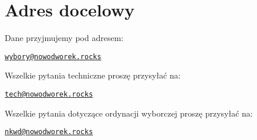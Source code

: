 \appendix

\section{Adres docelowy}

Dane przyjmujemy pod adresem:
\begin{center}\href{mailto:wybory@nowodworek.rocks}{\texttt{wybory@nowodworek.rocks}}\end{center}
Wszelkie pytania techniczne proszę przysyłać na:
\begin{center}\href{mailto:tech@nowodworek.rocks}{\texttt{tech@nowodworek.rocks}}\end{center}
Wszelkie pytania dotyczące ordynacji wyborczej proszę przysyłać na:
\begin{center}\href{mailto:nkwd@nowodworek.rocks}{\texttt{nkwd@nowodworek.rocks}}\end{center}
